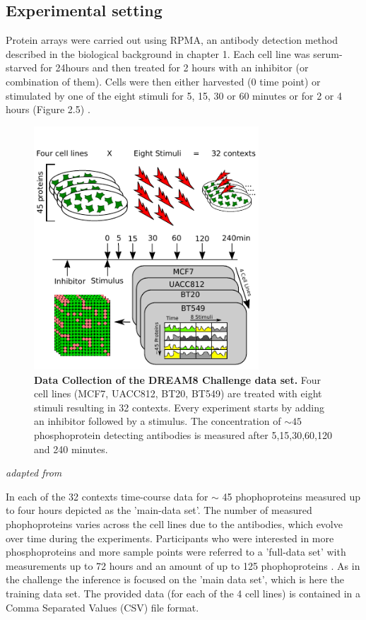 \subsection*{Experimental setting}
Protein arrays were carried out using RPMA, an antibody detection method described in the biological background in chapter 1. Each cell line was serum-starved for 24hours and then treated for 2 hours with an inhibitor (or combination of them). Cells were then either harvested (0 time point) or stimulated by one of the eight stimuli for 5, 15, 30 or 60 minutes or for 2 or 4 hours (Figure 2.5) \citep{Hennessy.2010}\citep{Hill.2016}.
\begin{figure}
\begin{minipage}{0.5\linewidth}
\hspace{25px}
\includegraphics[width=0.75\textwidth]{./Bilder/datacollectiondream8.pdf}
\end{minipage}
\caption[Data Collection of the DREAM8 Challenge data set]{\textbf{Data Collection of the DREAM8 Challenge data set.} Four cell lines (MCF7, UACC812, BT20, BT549) are treated with eight stimuli resulting in 32 contexts. Every experiment starts by adding an inhibitor followed by a stimulus. The concentration of $\sim 45$ phosphoprotein detecting antibodies is measured after 5,15,30,60,120 and 240 minutes. }
\label{fig:7}
\end{figure}
\textit{adapted from} \citep{Hill.2016}

In each of the 32 contexts time-course data for $\sim$ 45 phophoproteins measured up to four hours depicted as the 'main-data set'. The number of measured phophoproteins varies across the cell lines due to the antibodies, which evolve over time during the experiments. Participants who were interested in more phosphoproteins and more sample points were referred to a 'full-data set' with measurements up to 72 hours and an amount of up to 125 phophoproteins \citep{Hill.2016}.
As in the challenge the inference is focused on the 'main data set', which is here the training data set. The provided data (for each of the 4 cell lines) is contained in a Comma Separated Values (\gls{CSV}) file format.

